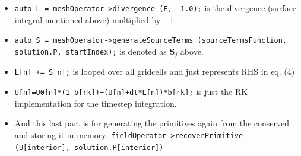 \documentclass{article}
\begin{document}
\begin{itemize}
	\item \texttt{auto L = meshOperator->divergence (F, -1.0);} is the divergence (surface integral mentioned above) multiplied by $-1$.
	\item \texttt{auto S = meshOperator->generateSourceTerms (sourceTermsFunction, solution.P, startIndex);} is denoted as $\mathbf{S}_j$ above. 
	\item \texttt{L[n] += S[n];} is looped over all gridcells and just represents RHS in eq. (4)
	\item \texttt{U[n]=U0[n]*(1-b[rk])+(U[n]+dt*L[n])*b[rk];} is just the RK implementation for the timestep integration.
	\item And this last part is for generating the primitives again from the conserved and storing it in memory: \texttt{fieldOperator->recoverPrimitive (U[interior], solution.P[interior])}
\end{itemize}
\end{document}
